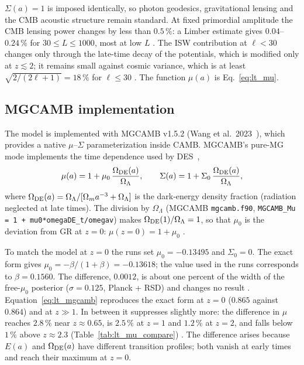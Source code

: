 $\Sigma(a)=1$ is imposed identically, so photon geodesics, gravitational lensing and the CMB acoustic structure remain standard. At fixed primordial
amplitude the CMB lensing power changes by less than $0.5\,\%$: a Limber estimate gives $0.04$--$0.24\,\%$ for $30\le L\le1000$, most at low $L$ \calc. The ISW
contribution at $\ell<30$ changes only through the late-time decay of the potentials, which is modified only at $z\lesssim2$; it remains small
against cosmic variance, which is at least $\sqrt{2/(2\ell+1)}=18\,\%$ for $\ell\le30$ \calc. The function $\mu(a)$ is Eq.~\eqref{eq:lt_mu}.

\subsection{MGCAMB implementation}
The model is implemented with MGCAMB v1.5.2 (Wang et al.\ 2023~\cite{Wang2023MGCAMB}), which provides a native $\mu$--$\Sigma$ parameterization
inside CAMB. MGCAMB's pure-MG mode implements the time dependence used by DES~\cite{DESY3Ext},
\begin{equation}
\mu(a)=1+\mu_0\,\frac{\Omega_{\rm DE}(a)}{\Omega_\Lambda},\qquad\Sigma(a)=1+\Sigma_0\,\frac{\Omega_{\rm DE}(a)}{\Omega_\Lambda},
\label{eq:lt_mgcamb}\end{equation}
where $\Omega_{\rm DE}(a)=\Omega_\Lambda/[\Omega_ma^{-3}+\Omega_\Lambda]$ is the dark-energy density fraction (radiation neglected at late times). The
division by $\Omega_\Lambda$ (MGCAMB \texttt{mgcamb.f90}, \texttt{MGCAMB\_Mu = 1 + mu0*omegaDE\_t/omegav}) makes $\Omega_{\rm DE}(1)/\Omega_\Lambda=1$,
so that $\mu_0$ is the deviation from GR at $z=0$: $\mu(z{=}0)=1+\mu_0$ \derived.

To match the model at $z=0$ the runs set $\mu_0=-0.13495$ and $\Sigma_0=0$. The exact form gives $\mu_0=-\beta/(1+\beta)=-0.13618$; the value used
in the runs corresponds to $\beta=0.1560$. The difference, $0.0012$, is about one percent of the width of the free-$\mu_0$ posterior
($\sigma=0.125$, Planck + RSD) and changes no result \calc. Equation~\eqref{eq:lt_mgcamb} reproduces the exact form at $z=0$ ($0.865$ against $0.864$)
and at $z\gg1$. In between it suppresses slightly more: the difference in $\mu$ reaches $2.8\,\%$ near $z\approx0.65$, is $2.5\,\%$ at $z=1$ and
$1.2\,\%$ at $z=2$, and falls below $1\,\%$ above $z\approx2.3$ (Table~\ref{tab:lt_mu_compare}) \calc. The difference arises because $E(a)$ and
$\Omega_{\rm DE}(a)$ have different transition profiles; both vanish at early times and reach their maximum at $z=0$.

